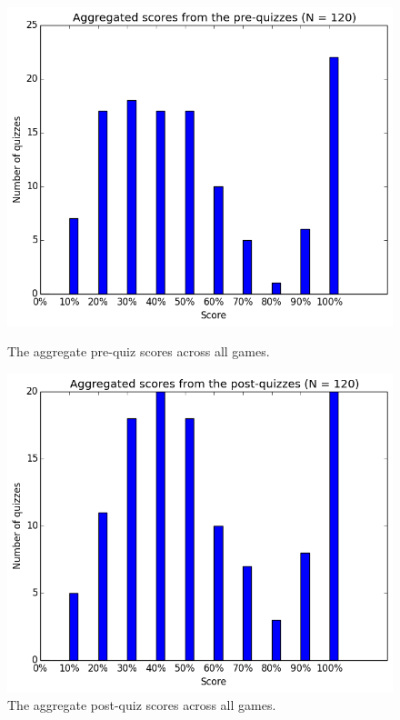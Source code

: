 			\begin{figure}[] 
			\centering 
			\begin{minipage}[b]{0.45\linewidth}
			\includegraphics[width=\textwidth]{general_pre.png} 
			\caption{The aggregate pre-quiz scores across all games.}
			\end{minipage}
			\quad
			\begin{minipage}[b]{0.45\linewidth}
			\includegraphics[width=\textwidth]{general_post.png} 
			\caption{The aggregate post-quiz scores across all games.}
			\end{minipage}
			\end{figure}

